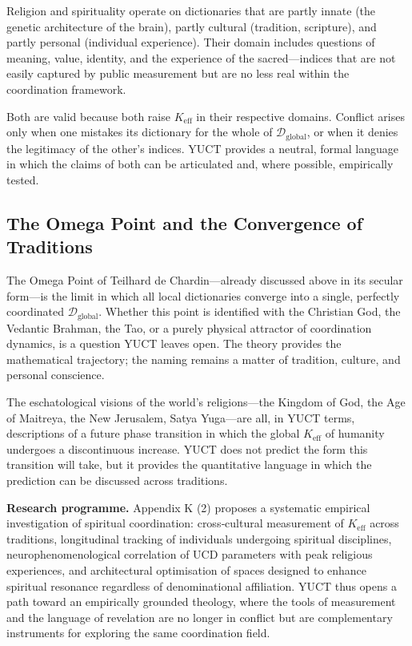 \documentclass[12pt,a4paper]{article}
\begin{document}
	Religion and spirituality operate on dictionaries that are partly innate (the genetic architecture of the brain), partly cultural (tradition, scripture), and partly personal (individual experience). Their domain includes questions of meaning, value, identity, and the experience of the sacred—indices that are not easily captured by public measurement but are no less real within the coordination framework.
	
	Both are valid because both raise \(K_{\mathrm{eff}}\) in their respective domains. Conflict arises only when one mistakes its dictionary for the whole of \(\mathcal{D}_{\text{global}}\), or when it denies the legitimacy of the other’s indices. YUCT provides a neutral, formal language in which the claims of both can be articulated and, where possible, empirically tested.
	
	\subsection{The Omega Point and the Convergence of Traditions}
	
	The Omega Point of Teilhard de Chardin—already discussed above in its secular form—is the limit in which all local dictionaries converge into a single, perfectly coordinated \(\mathcal{D}_{\text{global}}\). Whether this point is identified with the Christian God, the Vedantic Brahman, the Tao, or a purely physical attractor of coordination dynamics, is a question YUCT leaves open. The theory provides the mathematical trajectory; the naming remains a matter of tradition, culture, and personal conscience.
	
	The eschatological visions of the world’s religions—the Kingdom of God, the Age of Maitreya, the New Jerusalem, Satya Yuga—are all, in YUCT terms, descriptions of a future phase transition in which the global \(K_{\mathrm{eff}}\) of humanity undergoes a discontinuous increase. YUCT does not predict the form this transition will take, but it provides the quantitative language in which the prediction can be discussed across traditions.
	
	\textbf{Research programme.} Appendix K (2) proposes a systematic empirical investigation of spiritual coordination: cross‑cultural measurement of \(K_{\mathrm{eff}}\) across traditions, longitudinal tracking of individuals undergoing spiritual disciplines, neurophenomenological correlation of UCD parameters with peak religious experiences, and architectural optimisation of spaces designed to enhance spiritual resonance regardless of denominational affiliation. YUCT thus opens a path toward an empirically grounded theology, where the tools of measurement and the language of revelation are no longer in conflict but are complementary instruments for exploring the same coordination field.
	
\end{document}
